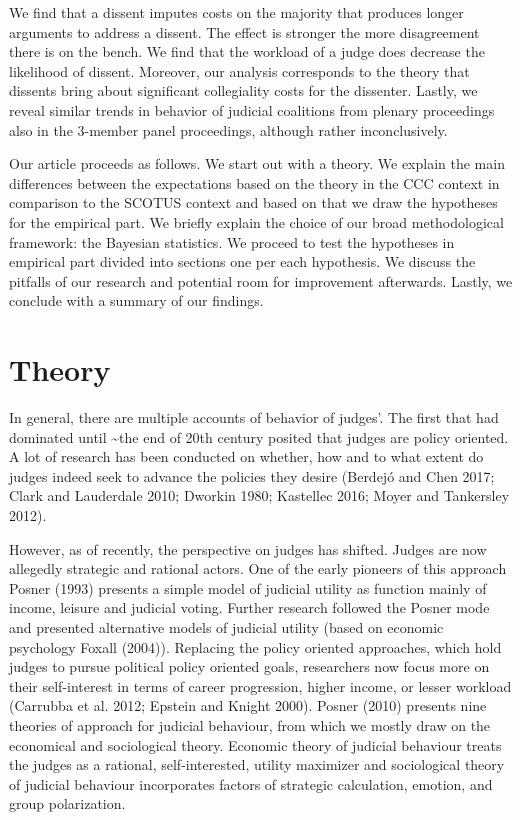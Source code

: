 \documentclass[
  11pt,
]{article}
\begin{document}
We find that a dissent imputes costs on the majority that produces
longer arguments to address a dissent. The effect is stronger the more
disagreement there is on the bench. We find that the workload of a judge
does decrease the likelihood of dissent. Moreover, our analysis
corresponds to the theory that dissents bring about significant
collegiality costs for the dissenter. Lastly, we reveal similar trends
in behavior of judicial coalitions from plenary proceedings also in the
3-member panel proceedings, although rather inconclusively.

Our article proceeds as follows. We start out with a theory. We explain
the main differences between the expectations based on the theory in the
CCC context in comparison to the SCOTUS context and based on that we
draw the hypotheses for the empirical part. We briefly explain the
choice of our broad methodological framework: the Bayesian statistics.
We proceed to test the hypotheses in empirical part divided into
sections one per each hypothesis. We discuss the pitfalls of our
research and potential room for improvement afterwards. Lastly, we
conclude with a summary of our findings.

\hypertarget{theory}{%
\section{Theory}\label{theory}}

In general, there are multiple accounts of behavior of judges'. The
first that had dominated until \textasciitilde the end of 20th century
posited that judges are policy oriented. A lot of research has been
conducted on whether, how and to what extent do judges indeed seek to
advance the policies they desire (Berdejó and Chen 2017; Clark and
Lauderdale 2010; Dworkin 1980; Kastellec 2016; Moyer and Tankersley
2012).

However, as of recently, the perspective on judges has shifted. Judges
are now allegedly strategic and rational actors. One of the early
pioneers of this approach Posner (1993) presents a simple model of
judicial utility as function mainly of income, leisure and judicial
voting. Further research followed the Posner mode and presented
alternative models of judicial utility (based on economic psychology
Foxall (2004)). Replacing the policy oriented approaches, which hold
judges to pursue political policy oriented goals, researchers now focus
more on their self-interest in terms of career progression, higher
income, or lesser workload (Carrubba et al. 2012; Epstein and Knight
2000). Posner (2010) presents nine theories of approach for judicial
behaviour, from which we mostly draw on the economical and sociological
theory. Economic theory of judicial behaviour treats the judges as a
rational, self-interested, utility maximizer and sociological theory of
judicial behaviour incorporates factors of strategic calculation,
emotion, and group polarization.
\end{document}
